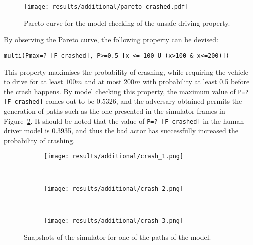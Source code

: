 \begin{figure}[H]
\centering
\texttt{[image: results/additional/pareto\_crashed.pdf]}
\caption{Pareto curve for the model checking of the unsafe driving property.}
\label{fig:unsafe_pareto}
\end{figure}

By observing the Pareto curve, the following property can be devised:

\begin{minipage}{\linewidth}
{\vspace{1em}
\begin{lstlisting}
multi(Pmax=? [F crashed], P>=0.5 [x <= 100 U (x>100 & x<=200)])
\end{lstlisting}
}
\end{minipage}

This property maximises the probability of crashing, while requiring the vehicle to drive for at least $100m$ and at most $200m$ with probability at least 0.5 before the crash happens. By model checking this property, the maximum value of \texttt{P=? [F crashed]} comes out to be 0.5326, and the adversary obtained permits the generation of paths such as the one presented in the simulator frames in Figure~\ref{fig:unsafe_sim}. It should be noted that the value of \texttt{P=? [F crashed]} in the human driver model is 0.3935, and thus the bad actor has successfully increased the probability of crashing. 

\vspace{1em}
\begin{figure}[H]
\centering
\begin{subfigure}{0.75\textwidth}
  \centering
  \texttt{[image: results/additional/crash\_1.png]}
\end{subfigure}\\ \vspace{2px}
\begin{subfigure}{0.75\textwidth}
  \centering
  \texttt{[image: results/additional/crash\_2.png]}
\end{subfigure} \\ \vspace{2px}
\begin{subfigure}{0.75\textwidth}
  \centering
  \texttt{[image: results/additional/crash\_3.png]}
\end{subfigure}
\caption{Snapshots of the simulator for one of the paths of the model.}
\label{fig:unsafe_sim}
\end{figure}

